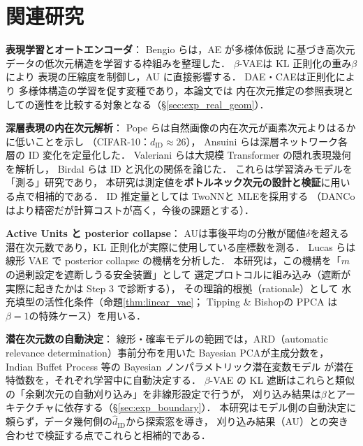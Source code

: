 \documentclass[11pt,a4paper]{jsarticle}
\newcommand{\dID}{d_{\mathrm{ID}}}
\newcommand{\hatdID}{\hat{d}_{\mathrm{ID}}}
\begin{document}
\section{関連研究}\label{sec:related}

\textbf{表現学習とオートエンコーダ}：
Bengio ら\cite{bengio2013representation}は，AE が多様体仮説
\cite{fefferman2016manifold}に基づき高次元データの低次元構造を学習する枠組みを整理した．
$\beta$-VAE\cite{higgins2017betavae}は KL 正則化の重み$\beta$により
表現の圧縮度を制御し，AU に直接影響する．
DAE\cite{alain2014dae}・CAE\cite{rifai2011cae}は正則化により
多様体構造の学習を促す変種であり，本論文では
内在次元推定の参照表現としての適性を比較する対象となる（§\ref{sec:exp_real_geom}）．

\textbf{深層表現の内在次元解析}：
Pope ら\cite{pope2021intrinsic}は自然画像の内在次元が画素次元よりはるかに低いことを示し
（CIFAR-10：$\dID \approx 26$），
Ansuini ら\cite{ansuini2019intrinsic}は深層ネットワーク各層の ID 変化を定量化した．
Valeriani ら\cite{valeriani2023geometry}は大規模 Transformer の隠れ表現幾何を解析し，
Birdal ら\cite{birdal2021intrinsic}は ID と汎化の関係を論じた．
これらは学習済みモデルを「測る」研究であり，
本研究は測定値を\textbf{ボトルネック次元の設計と検証}に用いる点で相補的である．
ID 推定量としては TwoNN\cite{facco2017twonn}と MLE\cite{levina2005mle}を採用する
（DANCo\cite{ceruti2014danco}はより精密だが計算コストが高く，今後の課題とする）．

\textbf{Active Units と posterior collapse}：
AU\cite{higgins2017betavae,lucas2019elbo}は事後平均の分散が閾値$\delta$を超える
潜在次元数であり，KL 正則化が実際に使用している座標数を測る．
Lucas ら\cite{lucas2019elbo}は線形 VAE で posterior collapse の機構を分析した．
本研究は，この機構を「$m$の過剰設定を遮断しうる安全装置」として
選定プロトコルに組み込み（遮断が実際に起きたかは Step 3 で診断する），
その理論的根拠（rationale）として
水充填型の活性化条件（命題\ref{thm:linear_vae}；
Tipping \& Bishop\cite{tippingbishop1999ppca}の PPCA は$\beta=1$の特殊ケース）を用いる．

\textbf{潜在次元数の自動決定}：
線形・確率モデルの範囲では，ARD（automatic relevance determination）事前分布を用いた
Bayesian PCA\cite{bishop1999bayesian}が主成分数を，
Indian Buffet Process 等の Bayesian ノンパラメトリック潜在変数モデル
\cite{ghahramani2005infinite}が潜在特徴数を，それぞれ学習中に自動決定する．
$\beta$-VAE の KL 遮断はこれらと類似の「余剰次元の自動刈り込み」を非線形設定で行うが，
刈り込み結果は$\beta$とアーキテクチャに依存する（§\ref{sec:exp_boundary}）．
本研究はモデル側の自動決定に頼らず，データ幾何側の$\hatdID$から探索窓を導き，
刈り込み結果（AU）との突き合わせで検証する点でこれらと相補的である．
\end{document}
